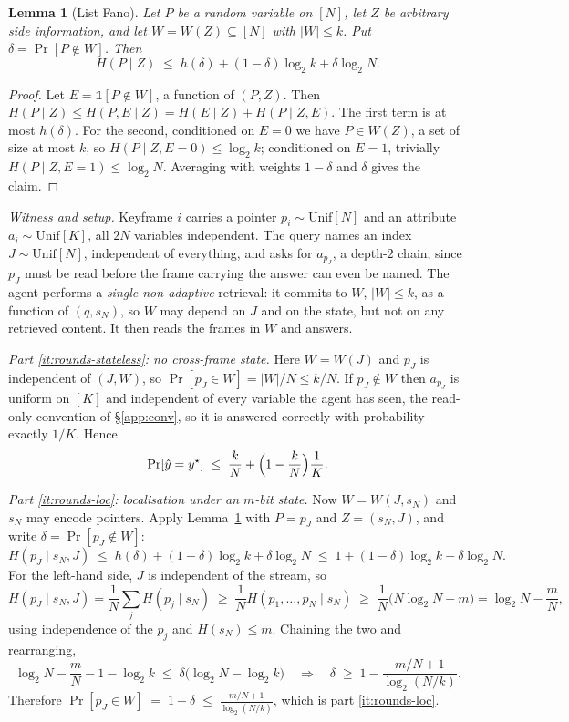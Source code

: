 \documentclass[10pt]{article}
\newtheorem{lemma}{Lemma}
\theoremstyle{definition}
\theoremstyle{plain}
\begin{document}
\begin{lemma}[List Fano]
\label{lem:listfano}
Let $P$ be a random variable on $[N]$, let $Z$ be arbitrary side information, and let $W=W(Z)\subseteq[N]$ with $|W|\le k$. Put $\delta=\Pr[P\notin W]$. Then
\[
H(P\mid Z)\;\le\;h(\delta)+(1-\delta)\log_2 k+\delta\log_2 N .
\]
\end{lemma}
\begin{proof}
Let $E=\mathbb{1}[P\notin W]$, a function of $(P,Z)$. Then
$H(P\mid Z)\le H(P,E\mid Z)=H(E\mid Z)+H(P\mid Z,E)$.
The first term is at most $h(\delta)$. For the second, conditioned on $E=0$ we have $P\in W(Z)$, a set of size at most $k$, so $H(P\mid Z,E=0)\le\log_2k$; conditioned on $E=1$, trivially $H(P\mid Z,E=1)\le\log_2N$. Averaging with weights $1-\delta$ and $\delta$ gives the claim.
\end{proof}

\emph{Witness and setup.} Keyframe $i$ carries a pointer $p_i\sim\mathrm{Unif}[N]$ and an attribute $a_i\sim\mathrm{Unif}[K]$, all $2N$ variables independent. The query names an index $J\sim\mathrm{Unif}[N]$, independent of everything, and asks for $a_{p_J}$, a depth-$2$ chain, since $p_J$ must be read before the frame carrying the answer can even be named. The agent performs a \emph{single non-adaptive} retrieval: it commits to $W$, $|W|\le k$, as a function of $(q,s_N)$, so $W$ may depend on $J$ and on the state, but not on any retrieved content. It then reads the frames in $W$ and answers.

\emph{Part \ref{it:rounds-stateless}: no cross-frame state.} Here $W=W(J)$ and $p_J$ is independent of $(J,W)$, so $\Pr[p_J\in W]=|W|/N\le k/N$. If $p_J\notin W$ then $a_{p_J}$ is uniform on $[K]$ and independent of every variable the agent has seen, the read-only convention of \S\ref{app:conv}, so it is answered correctly with probability exactly $1/K$. Hence
\[
\Pr[\hat y=y^{\star}]\;\le\;\frac kN+\Bigl(1-\frac kN\Bigr)\frac1K .
\]

\emph{Part \ref{it:rounds-loc}: localisation under an $m$-bit state.} Now $W=W(J,s_N)$ and $s_N$ may encode pointers. Apply Lemma~\ref{lem:listfano} with $P=p_J$ and $Z=(s_N,J)$, and write $\delta=\Pr[p_J\notin W]$:
\[
H(p_J\mid s_N,J)\;\le\;h(\delta)+(1-\delta)\log_2k+\delta\log_2N\;\le\;1+(1-\delta)\log_2k+\delta\log_2N .
\]
For the left-hand side, $J$ is independent of the stream, so
\[
H(p_J\mid s_N,J)=\frac1N\sum_{j}H(p_j\mid s_N)\;\ge\;\frac1N H(p_1,\dots,p_N\mid s_N)\;\ge\;\frac1N\bigl(N\log_2N-m\bigr)=\log_2N-\frac mN,
\]
using independence of the $p_j$ and $H(s_N)\le m$. Chaining the two and rearranging,
\[
\log_2N-\frac mN-1-\log_2k\;\le\;\delta\bigl(\log_2N-\log_2k\bigr)
\quad\Longrightarrow\quad
\delta\;\ge\;1-\frac{m/N+1}{\log_2(N/k)} .
\]
Therefore $\Pr[p_J\in W]\;=\;1-\delta\;\le\;\frac{m/N+1}{\log_2(N/k)}$, which is part \ref{it:rounds-loc}.
\end{document}
